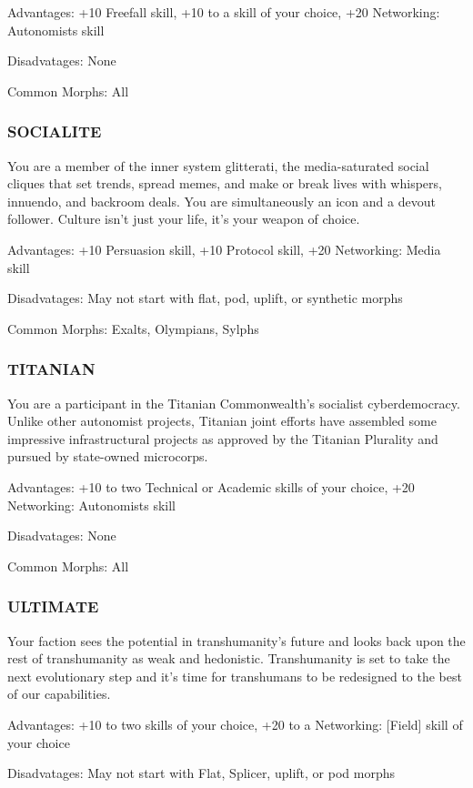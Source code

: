  Advantages: +10 Freefall skill, +10 to a skill of your
choice, +20 Networking: Autonomists skill

 Disadvatages: None

 Common Morphs: All

\subsubsection{SOCIALITE}
You are a member of the inner system glitterati, the
media-saturated social cliques that set trends, spread
memes, and make or break lives with whispers, innuendo, and backroom deals. You are simultaneously
an icon and a devout follower. Culture isn’t just your
life, it’s your weapon of choice.

 Advantages: +10 Persuasion skill, +10 Protocol skill,
+20 Networking: Media skill

 Disadvatages: May not start with flat, pod, uplift, or
synthetic morphs

 Common Morphs: Exalts, Olympians, Sylphs

\subsubsection{TITANIAN}
You are a participant in the Titanian Commonwealth’s
socialist cyberdemocracy. Unlike other autonomist
projects, Titanian joint efforts have assembled some
impressive infrastructural projects as approved by
the Titanian Plurality and pursued by state-owned
microcorps.

 Advantages: +10 to two Technical or Academic skills
of your choice, +20 Networking: Autonomists skill

 Disadvatages: None

 Common Morphs: All

\subsubsection{ULTIMATE}
Your faction sees the potential in transhumanity’s
future and looks back upon the rest of transhumanity as weak and hedonistic. Transhumanity is set
to take the next evolutionary step and it’s time for
transhumans to be redesigned to the best of our
capabilities.

 Advantages: +10 to two skills of your choice, +20 to a
Networking: [Field] skill of your choice

 Disadvatages: May not start with Flat, Splicer, uplift,
or pod morphs

